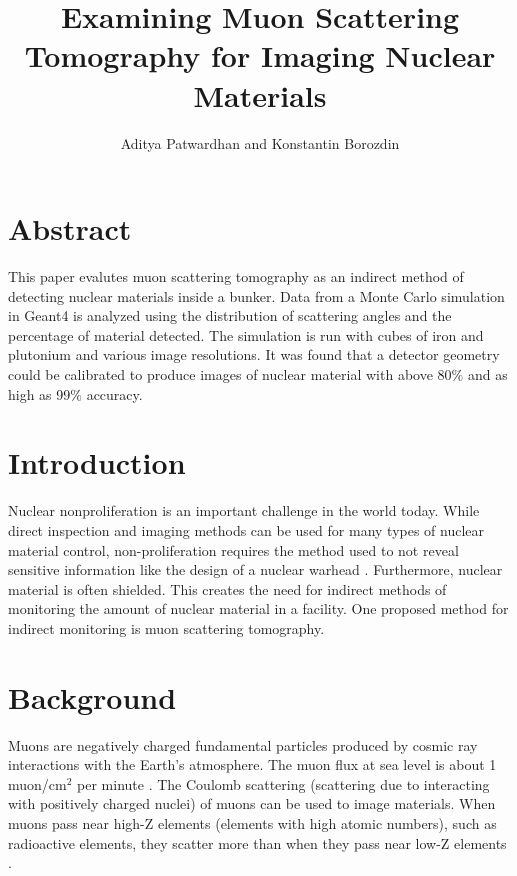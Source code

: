 \documentclass[10pt,a4paper]{article}
\title{Examining Muon Scattering Tomography for Imaging Nuclear Materials}
\author{Aditya Patwardhan and Konstantin Borozdin}
\begin{document}
\maketitle

\section{Abstract}
    This paper evalutes muon scattering tomography as an indirect method of detecting nuclear materials inside a bunker. Data from a Monte Carlo simulation in Geant4 is analyzed using the distribution of scattering angles and the percentage of material detected. The simulation is run with cubes of iron and plutonium and various image resolutions. It was found that a detector geometry could be calibrated to produce images of nuclear material with above 80\(\%\) and as high as 99\(\%\) accuracy.
    
\section{Introduction}
    Nuclear nonproliferation is an important challenge in the world today. While direct inspection and imaging methods can be used for many types of nuclear material control, non-proliferation requires the method used to not reveal sensitive information like the design of a nuclear warhead \cite{international2022iaea}. Furthermore, nuclear material is often shielded. This creates the need for indirect methods of monitoring the amount of nuclear material in a facility. One proposed method for indirect monitoring is muon scattering tomography.
	
\section{Background}
    
    Muons are negatively charged fundamental particles produced by cosmic ray interactions with the Earth's atmosphere. The muon flux at sea level is about 1 muon/cm$^2$ per minute \cite{doeexplainsmuons}. The Coulomb scattering (scattering due to interacting with positively charged nuclei) of muons can be used to image materials. When muons pass near high-Z elements (elements with high atomic numbers), such as radioactive elements, they scatter more than when they pass near low-Z elements \cite{international2022iaea}.
\end{document}
